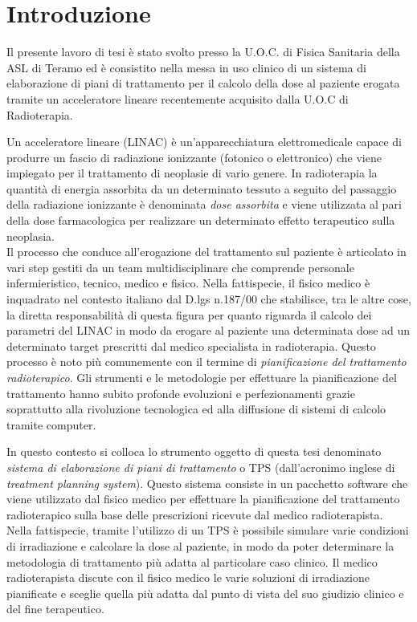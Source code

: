 \chapter*{Introduzione} 
Il presente lavoro di tesi è stato svolto presso la U.O.C. di Fisica Sanitaria della ASL di Teramo ed è consistito nella messa in uso clinico di un sistema di elaborazione di piani di trattamento per il calcolo della dose al paziente erogata tramite un acceleratore lineare recentemente acquisito dalla U.O.C di Radioterapia. 

Un acceleratore lineare (LINAC) è un'apparecchiatura elettromedicale capace di produrre un fascio di radiazione ionizzante (fotonico o elettronico) che viene impiegato per il trattamento di neoplasie di vario genere. In radioterapia la quantità di energia assorbita da un determinato tessuto a seguito del passaggio della radiazione ionizzante è denominata \textit{dose assorbita} e viene utilizzata al pari della dose farmacologica per realizzare un determinato effetto terapeutico sulla neoplasia.\\
Il processo che conduce all'erogazione del trattamento sul paziente è articolato in vari step gestiti da un team multidisciplinare che comprende personale infermieristico, tecnico, medico e fisico. Nella fattispecie, il fisico medico è inquadrato nel contesto italiano dal D.lgs n.187/00 che stabilisce, tra le altre cose, la diretta responsabilità di questa figura per quanto riguarda il calcolo dei parametri del LINAC in modo da erogare al paziente una determinata dose ad un determinato target prescritti dal medico specialista in radioterapia. Questo processo è noto più comunemente con il termine di \textit{pianificazione del trattamento radioterapico}. Gli strumenti e le metodologie per effettuare la pianificazione del trattamento hanno subito profonde evoluzioni e perfezionamenti grazie soprattutto alla rivoluzione tecnologica ed alla diffusione di sistemi di calcolo tramite computer. 

In questo contesto si colloca lo strumento oggetto di questa tesi denominato \textit{sistema di elaborazione di piani di trattamento} o TPS (dall'acronimo inglese di \textit{treatment planning system}). Questo sistema consiste in un pacchetto software che viene utilizzato dal fisico medico per effettuare la pianificazione del trattamento radioterapico sulla base delle prescrizioni ricevute dal medico radioterapista. Nella fattispecie, tramite l'utilizzo di un TPS è possibile simulare varie condizioni di irradiazione e calcolare la dose al paziente, in modo da poter determinare la metodologia di trattamento più adatta al particolare caso clinico. Il medico radioterapista discute con il fisico medico le varie soluzioni di irradiazione pianificate e sceglie quella più adatta dal punto di vista del suo giudizio clinico e del fine terapeutico.


